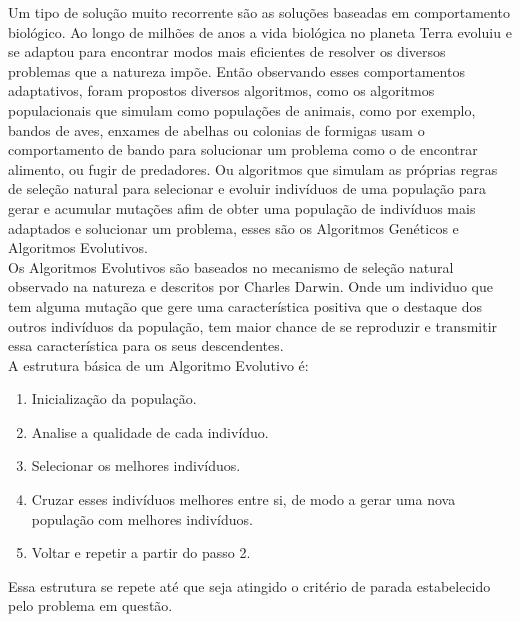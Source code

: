         Um tipo de solução muito recorrente são as soluções baseadas em comportamento biológico. 
        Ao longo de milhões de anos a vida biológica no planeta Terra evoluiu e se adaptou para encontrar modos mais eficientes de resolver os diversos problemas que a natureza impõe. 
        Então observando esses comportamentos adaptativos, foram propostos diversos algoritmos, 
        como os algoritmos populacionais que simulam como populações de animais, como por exemplo, bandos de aves, enxames de abelhas ou colonias de formigas usam o comportamento de bando para solucionar um problema como o de encontrar alimento, ou fugir de predadores. 
        Ou algoritmos que simulam as próprias regras de seleção natural para selecionar e evoluir indivíduos de uma população para gerar e acumular mutações afim de obter uma população de indivíduos mais adaptados e solucionar um problema, esses são os Algoritmos Genéticos e Algoritmos Evolutivos.\\


        Os Algoritmos Evolutivos são baseados no mecanismo de seleção natural observado na natureza e descritos por Charles Darwin. Onde um individuo que tem alguma mutação que gere uma característica positiva que o destaque dos outros indivíduos da população, tem maior chance de se reproduzir e transmitir essa característica para os seus descendentes.\\
        
        \noindent A estrutura básica de um Algoritmo Evolutivo é:
        \begin{enumerate}
            \item Inicialização da população.
            \item Analise a qualidade de cada indivíduo.
            \item Selecionar os melhores indivíduos.
            \item Cruzar esses indivíduos melhores entre si, de modo a gerar uma nova população com melhores indivíduos.
            \item Voltar e repetir a partir do passo 2.
        \end{enumerate}
        
        Essa estrutura se repete até que seja atingido o critério de parada estabelecido pelo problema em questão.\\
        
